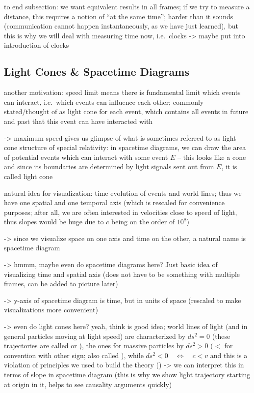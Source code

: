 to end subsection: we want equivalent results in all frames; if we try to measure a distance, this requires a notion of \enquote{at the same time}; harder than it sounds (communication cannot happen instantaneously, as we have just learned), but this is why we will deal with measuring time now, i.e.~clocks -> maybe put into introduction of clocks



		\subsection{Light Cones \& Spacetime Diagrams}
another motivation: speed limit means there is fundamental limit which events can interact, i.e.~which events can influence each other; commonly stated/thought of as light cone for each event, which contains all events in future and past that this event can have interacted with

-> maximum speed gives us glimpse of what is sometimes referred to as light cone structure of special relativity: in spacetime diagrams, we can draw the area of potential events which can interact with some event $E$ -- this looks like a cone and since its boundaries are determined by light signals sent out from $E$, it is called light cone



natural idea for visualization: time evolution of events and world lines; thus we have one spatial and one temporal axis (which is rescaled for convenience purposes; after all, we are often interested in velocities close to speed of light, thus slopes would be huge due to $c$ being on the order of $10^8$)

-> since we visualize space on one axis and time on the other, a natural name is spacetime diagram

-> hmmm, maybe even do spacetime diagrams here? Just basic idea of visualizing time and spatial axis (does not have to be something with multiple frames, can be added to picture later)

-> y-axis of spacetime diagram is time, but in units of space (rescaled to make visualizations more convenient)


-> even do light cones here? yeah, think is good idea; world lines of light (and in general particles moving at light speed) are characterized by $ds^2 = 0$ (these trajectories are called  or ), the ones for massive particles by $ds^2 > 0$ ($<$ for convention with other sign; also called ), while $ds^2 < 0 \quad \Leftrightarrow \quad c < v$ and this is a violation of principles we used to build the theory () -> we can interpret this in terms of slope in spacetime diagram (this is why we show light trajectory starting at origin in it, helps to see causality arguments quickly)


